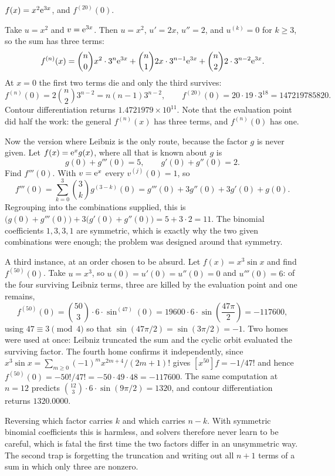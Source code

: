 \begin{worked}
$f(x)=x^{2}\mathrm{e}^{3x}$, and $f^{(20)}(0)$.

Take $u=x^{2}$ and $v=\mathrm{e}^{3x}$. Then $u=x^{2}$, $u'=2x$, $u''=2$, and $u^{(k)}=0$ for $k\geq3$, so the sum has three terms:
\[
f^{(n)}(x)=\binom n0 x^{2}\cdot3^{n}\mathrm{e}^{3x}+\binom n1 2x\cdot3^{n-1}\mathrm{e}^{3x}+\binom n2 2\cdot3^{n-2}\mathrm{e}^{3x}.
\]
At $x=0$ the first two terms die and only the third survives:
\[
f^{(n)}(0)=2\binom n2 3^{n-2}=n(n-1)3^{n-2},\qquad f^{(20)}(0)=20\cdot19\cdot3^{18}=147219785820 .
\]
Contour differentiation returns $1.4721979\times10^{11}$. Note that the evaluation point did half the work: the general $f^{(n)}(x)$ has three terms, and $f^{(n)}(0)$ has one.

Now the version where Leibniz is the only route, because the factor $g$ is never given. Let $f(x)=\mathrm{e}^{x}g(x)$, where all that is known about $g$ is
\[
g(0)+g'''(0)=5,\qquad g'(0)+g''(0)=2 .
\]
Find $f'''(0)$. With $v=\mathrm{e}^{x}$ every $v^{(j)}(0)=1$, so
\[
f'''(0)=\sum_{k=0}^{3}\binom 3k g^{(3-k)}(0)=g'''(0)+3g''(0)+3g'(0)+g(0).
\]
Regrouping into the combinations supplied, this is $\bigl(g(0)+g'''(0)\bigr)+3\bigl(g'(0)+g''(0)\bigr)=5+3\cdot2=11$. The binomial coefficients $1,3,3,1$ are symmetric, which is exactly why the two given combinations were enough; the problem was designed around that symmetry.

A third instance, at an order chosen to be absurd. Let $f(x)=x^{3}\sin x$ and find $f^{(50)}(0)$. Take $u=x^{3}$, so $u(0)=u'(0)=u''(0)=0$ and $u'''(0)=6$: of the four surviving Leibniz terms, three are killed by the evaluation point and one remains,
\[
f^{(50)}(0)=\binom{50}{3}\cdot6\cdot\sin^{(47)}(0)=19600\cdot6\cdot\sin\!\left(\frac{47\pi}{2}\right)=-117600 ,
\]
using $47\equiv3\pmod4$ so that $\sin(47\pi/2)=\sin(3\pi/2)=-1$. Two homes were used at once: Leibniz truncated the sum and the cyclic orbit evaluated the surviving factor. The fourth home confirms it independently, since $x^{3}\sin x=\sum_{m\geq0}(-1)^{m}x^{2m+4}/(2m+1)!$ gives $[x^{50}]f=-1/47!$ and hence $f^{(50)}(0)=-50!/47!=-50\cdot49\cdot48=-117600$. The same computation at $n=12$ predicts $\binom{12}{3}\cdot6\cdot\sin(9\pi/2)=1320$, and contour differentiation returns $1320.0000$.
\end{worked}

\begin{trap}
Reversing which factor carries $k$ and which carries $n-k$. With symmetric binomial coefficients this is harmless, and solvers therefore never learn to be careful, which is fatal the first time the two factors differ in an unsymmetric way. The second trap is forgetting the truncation and writing out all $n+1$ terms of a sum in which only three are nonzero.
\end{trap}

